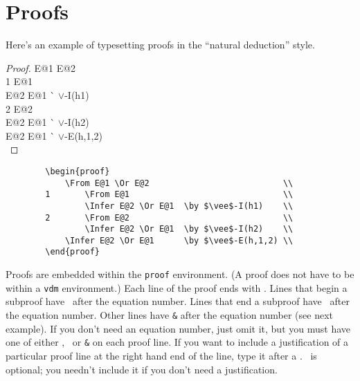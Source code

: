 \documentclass{article}
\renewcommand{\^}[1]{$\langle${\rm #1\/}$\rangle$}
\newcommand{\cs}[1]{\leavevmode\hbox{\tt \string#1}}
\begin{document}
\section{Proofs}

Here's an example of typesetting proofs in the ``natural deduction''
style.

\begin{proof}
  \From E@1 \Or E@2     \\
1   \From E@1   \\
    \Infer E@2 \Or E@1  \` $\vee$-I(h1) \\
2   \From E@2           \\
    \Infer E@2 \Or E@1  \` $\vee$-I(h2) \\
  \Infer E@2 \Or E@1    \` $\vee$-E(h,1,2)\\
\end{proof}
\begin{verbatim}
        \begin{proof}
            \From E@1 \Or E@2                           \\
        1       \From E@1                               \\
                \Infer E@2 \Or E@1  \by $\vee$-I(h1)    \\
        2       \From E@2                               \\
                \Infer E@2 \Or E@1  \by $\vee$-I(h2)    \\
            \Infer E@2 \Or E@1      \by $\vee$-E(h,1,2) \\
        \end{proof}
\end{verbatim}

Proofs are embedded within the {\tt proof} environment.  (A proof does
not have to be within a {\tt vdm} environment.)  Each line of the
proof ends with \cs\\.  Lines that begin a subproof
have \cs\From\ after the equation number.  Lines that end a
subproof have \cs\Infer\ after the equation number.  Other lines
have \cs\& after the equation number (see next example).  If you
don't need an equation number, just omit it,  but you must have one of
either \cs\From, \cs\Infer\ or \cs\& on each proof line.
If you want to include a justification of a particular proof line at
the right hand end of the line, type it after a \cs\by.  \cs\by\
is optional; you needn't include it if you don't need a justification.
\end{document}
